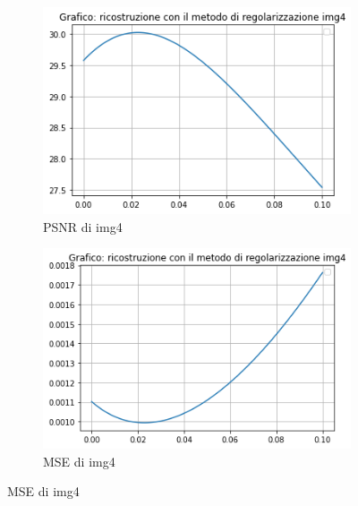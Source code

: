 \begin{figure}[H]\ContinuedFloat
    \centering
    \begin{subfigure}{0.5\textwidth}
        \centering
        \includegraphics[width=\textwidth]{output/PSNR/outputPSNR-img4.png}
        \caption{PSNR di img4}
        \label{fig:img4PSNR}
    \end{subfigure}\hfill
    \begin{subfigure}{0.5\textwidth}
        \centering
        \includegraphics[width=\textwidth]{output/MSE/outputMSE-img4.png}
        \caption{MSE di img4}
        \label{fig:img4MSE}
    \end{subfigure}


\end{figure}
